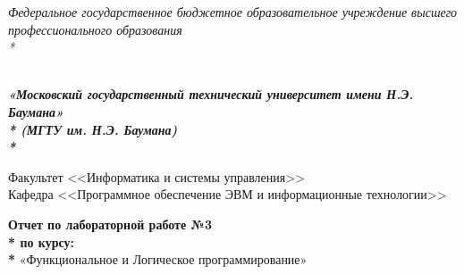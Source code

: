 \newpage
\begin{titlepage}
\thispagestyle{empty}

{\large
\begin{center}
	\textsl{Федеральное государственное бюджетное образовательное учреждение высшего профессионального образования \\* }	
	\vspace{2em}
\end{center}
}
{
\begin{minipage}[t]{0.13\textwidth}
  \centering{}
  \label{fig0}
  \end{minipage}\hfill
\begin{minipage}[t]{0.65\textwidth}
\begin{center}
\large  \textsl{\textbf {\\ «Московский государственный технический университет имени Н.Э. Баумана» \\* (МГТУ им. Н.Э. Баумана) \\* }}
  \end{center}
\end{minipage}
}

\vspace{2em}

\hrulefill

\begin{center}
 	\vspace{0pt plus2fill} %
	{\large
	Факультет  <<Информатика и системы управления>>\\
	Кафедра  <<Программное обеспечение ЭВМ и информационные технологии>>
	}
\end{center}

{\Large
\begin{center}
	\textbf{Отчет по лабораторной работе №3 \\* по курсу: \\* } «Функциональное и Логическое программирование» \\
\end{center}
}
%
\vspace{0pt plus4fill} %


\end{titlepage}
